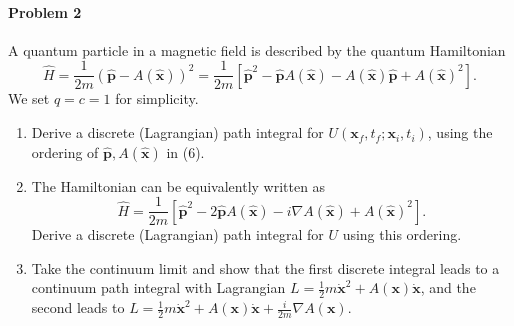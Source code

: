 \documentclass[hyperref, a4paper]{article}
\begin{document}
\paragraph{Problem 2} A quantum particle in a magnetic field is described by the quantum Hamiltonian
$$
\hat{H}=\frac{1}{2 m}(\hat{\mathbf{p}}-A(\hat{\mathbf{x}}))^2=\frac{1}{2 m}\left[\hat{\mathbf{p}}^2-\hat{\mathbf{p}} A(\hat{\mathbf{x}})-A(\hat{\mathbf{x}}) \hat{\mathbf{p}}+A(\hat{\mathbf{x}})^2\right] .
$$
We set $q=c=1$ for simplicity.
\begin{enumerate}
    \item Derive a discrete (Lagrangian) path integral for $U\left(\mathbf{x}_f, t_f ; \mathbf{x}_i, t_i\right)$, using the ordering of $\hat{\mathbf{p}}, A(\hat{\mathbf{x}})$ in (6).
    \item The Hamiltonian can be equivalently written as
    $$
    \hat{H}=\frac{1}{2 m}\left[\hat{\mathbf{p}}^2-2 \hat{\mathbf{p}} A(\hat{\mathbf{x}})-i \nabla A(\hat{\mathbf{x}})+A(\hat{\mathbf{x}})^2\right] .
    $$
    Derive a discrete (Lagrangian) path integral for $U$ using this ordering.
    \item Take the continuum limit and show that the first discrete integral leads to a continuum path integral with Lagrangian $L=\frac{1}{2} m \dot{\mathbf{x}}^2+A(\mathbf{x}) \dot{\mathbf{x}}$, and the second leads to $L=\frac{1}{2} m \dot{\mathbf{x}}^2+A(\mathbf{x}) \dot{\mathbf{x}}+\frac{i}{2 m} \nabla A(\mathbf{x})$.
\end{enumerate}
\end{document}
